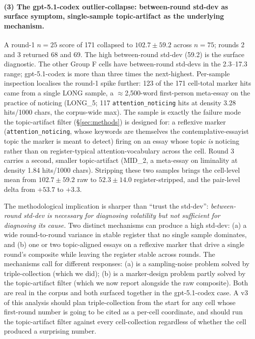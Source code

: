 \documentclass[11pt,a4paper]{article}
\begin{document}
\paragraph{(3) The gpt-5.1-codex outlier-collapse: between-round std-dev as surface symptom, single-sample topic-artifact as the underlying mechanism.} A round-1 $n{=}25$ score of 171 collapsed to $102.7 \pm 59.2$ across $n{=}75$; rounds 2 and 3 returned 68 and 69. The high between-round std-dev (59.2) is the surface diagnostic. The other Group F cells have between-round std-devs in the 2.3--17.3 range; gpt-5.1-codex is more than three times the next-highest. Per-sample inspection localises the round-1 spike further: 123 of the 171 cell-total marker hits came from a single LONG sample, a $\approx$2{,}500-word first-person meta-essay on the practice of noticing (LONG\_5; 117 \texttt{attention\allowbreak\_noticing} hits at density 3.28 hits/1000 chars, the corpus-wide max). The sample is exactly the failure mode the topic-artifact filter (\S\ref{sec:methods}) is designed for: a reflexive marker (\texttt{attention\allowbreak\_noticing}, whose keywords are themselves the contemplative-essayist topic the marker is meant to detect) firing on an essay whose topic \emph{is} noticing rather than on register-typical attention-vocabulary across the cell. Round 3 carries a second, smaller topic-artifact (MID\_2, a meta-essay on liminality at density 1.84 hits/1000 chars). Stripping these two samples brings the cell-level mean from $102.7 \pm 59.2$ raw to $52.3 \pm 14.0$ register-stripped, and the pair-level delta from $+53.7$ to $+3.3$.

The methodological implication is sharper than ``trust the std-dev'': \emph{between-round std-dev is necessary for diagnosing volatility but not sufficient for diagnosing its cause.} Two distinct mechanisms can produce a high std-dev: (a) a wide round-to-round variance in stable register that no single sample dominates, and (b) one or two topic-aligned essays on a reflexive marker that drive a single round's composite while leaving the register stable across rounds. The mechanisms call for different responses: (a) is a sampling-noise problem solved by triple-collection (which we did); (b) is a marker-design problem partly solved by the topic-artifact filter (which we now report alongside the raw composite). Both are real in the corpus and both surfaced together in the gpt-5.1-codex case. A v3 of this analysis should plan triple-collection from the start for any cell whose first-round number is going to be cited as a per-cell coordinate, and should run the topic-artifact filter against every cell-collection regardless of whether the cell produced a surprising number.
\end{document}
